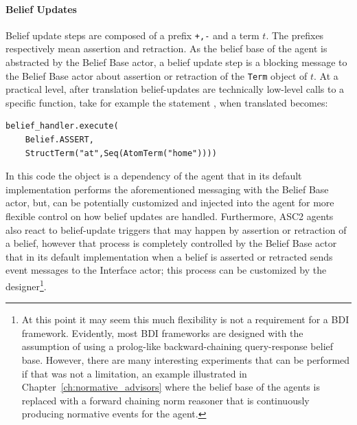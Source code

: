 \paragraph{Belief Updates}
Belief update steps are composed of a prefix \verb|+,-| and a term $t$. The prefixes respectively mean assertion and retraction. As the belief base of the agent is abstracted by the Belief Base actor, a belief update step is a blocking message to the Belief Base actor about assertion or retraction of the \verb+Term+ object of $t$. At a practical level, after translation belief-updates are technically low-level calls to a specific function, take for example the statement , when translated becomes:
\begin{verbatim}
belief_handler.execute(
    Belief.ASSERT,
    StructTerm("at",Seq(AtomTerm("home"))))
\end{verbatim}
In this code the object   is a dependency of the agent that in its default implementation performs the aforementioned messaging with the Belief Base actor, but, can be potentially customized and injected into the agent for more flexible control on how belief updates are handled. Furthermore, ASC2 agents also react to belief-update triggers that may happen by assertion or retraction of a belief, however that process is completely controlled by the Belief Base actor that in its default implementation when a belief is asserted or retracted sends event messages to the Interface actor; this process can be customized by the designer\footnote{At this point it may seem this much flexibility is not a requirement for a BDI framework. Evidently, most BDI frameworks are designed with the assumption of using a prolog-like backward-chaining query-response belief base. However, there are many interesting experiments that can be performed if that was not a limitation, an example illustrated in Chapter~\ref{ch:normative_advisors} where the belief base of the agents is replaced with a forward chaining norm reasoner that is continuously producing normative events for the agent.}.

